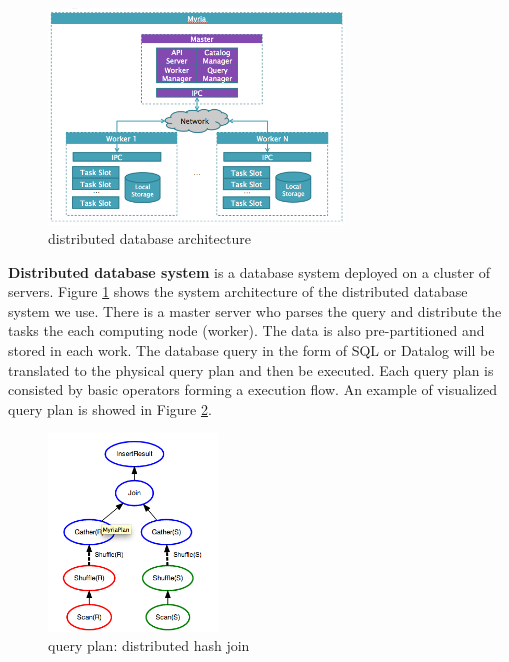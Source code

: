 \documentclass[11pt]{article}
\begin{document}
\begin{figure}
 \begin{center}
     \includegraphics[width=0.7\textwidth]{myria.png}
   \end{center}
  \caption{distributed database architecture}
  \label{fig:myria_arc}
\end{figure}

\textbf{Distributed database system} is a database system deployed on a cluster of servers.  Figure \ref{fig:myria_arc} shows the system architecture of the distributed database system we use. There is a master server who parses the query and distribute the tasks the each computing node (worker). The data is also pre-partitioned and stored in each work.  The database query in the form of SQL or Datalog will be translated to the physical query plan and then be executed. Each query plan is consisted by basic operators forming a execution flow. An example of visualized query plan is showed in Figure \ref{fig:query_plan}. 

\begin{figure}
 \begin{center}
     \includegraphics[width=0.4\textwidth]{partition_join.png}
   \end{center}
  \caption{query plan: distributed hash join}
  \label{fig:query_plan}
\end{figure}
\end{document}
